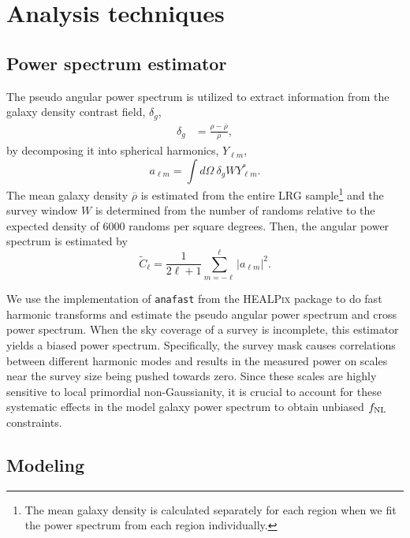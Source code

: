 \section{Analysis techniques}
\label{sec:method} 
 
\subsection{Power spectrum estimator}
The pseudo angular power spectrum \citep{hivon2002master} is utilized to extract information from the galaxy density contrast field, $\delta_{g}$, 
\begin{align}\label{eq:delta}
    \delta_{g} &= \frac{\rho- \overline{\rho}}{\overline{\rho}},
\end{align}
by decomposing it into spherical harmonics, $Y_{\ell m}$,
\begin{equation}
        a_{\ell m} = \int d\Omega ~ \delta_{g} W Y^{*}_{\ell m}.
\end{equation}
The mean galaxy density $\overline{\rho}$ is estimated from the entire LRG sample\footnote{The mean galaxy density is calculated separately for each region when we fit the power spectrum from each region individually.} and the survey window $W$ is determined from the number of randoms relative to the expected density of $6000$ randoms per square degrees. Then, the angular power spectrum is estimated by
\begin{equation}\label{eq:pusedocell}
        \tilde{C}_{\ell} = \frac{1}{2\ell +1} \sum_{m=-\ell}^{\ell} |a_{\ell m}|^{2}.
\end{equation}

We use the implementation of \texttt{anafast} from the \textsc{HEALPix} package \citep{gorski2005healpix} to do fast harmonic transforms and estimate the pseudo angular power spectrum and cross power spectrum. When the sky coverage of a survey is incomplete, this estimator yields a biased power spectrum. Specifically, the survey mask causes correlations between different harmonic modes and results in the measured power on scales near the survey size being pushed towards zero. Since these scales are highly sensitive to local primordial non-Gaussianity, it is crucial to account for these systematic effects in the model galaxy power spectrum to obtain unbiased $f_{\rm NL}$ constraints.

 \subsection{Modeling}

